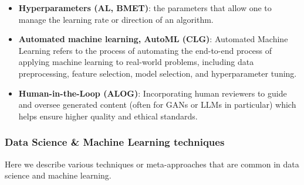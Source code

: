 \documentclass{article}
\begin{document}
\begin{itemize}
	\item \textbf{Hyperparameters (AL, BMET)}: the parameters that allow one to manage the learning rate or direction of an algorithm.

	\item \textbf{Automated machine learning, AutoML (CLG)}: Automated Machine Learning refers to the process of automating the end-to-end process of applying machine learning to real-world problems, including data preprocessing, feature selection, model selection, and hyperparameter tuning.

	\item \textbf{Human-in-the-Loop (ALOG)}: Incorporating human reviewers to guide and oversee generated content (often for GANs or LLMs in particular) which helps ensure higher quality and ethical standards.

\end{itemize}



\subsubsection*{Data Science \& Machine Learning techniques}

Here we describe various techniques or meta-approaches that are common in data science and machine learning.
\end{document}
